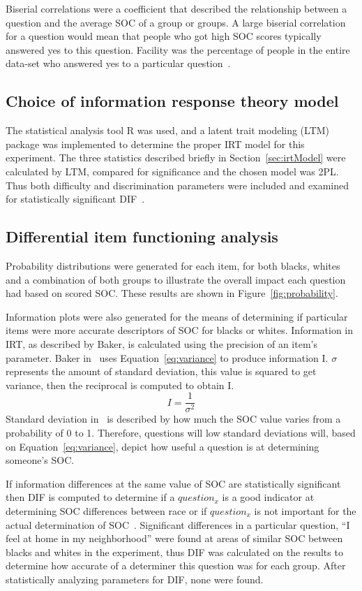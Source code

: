 \documentclass{sig-alternate}
\begin{document}
Biserial correlations were a coefficient that described the relationship between a question and the average SOC of a group or groups. A large biserial correlation for a question would mean that people who got high SOC scores typically answered yes to this question. Facility was the percentage of people in the entire data-set who answered yes to a particular question~\cite{biserial:2006}.

\subsection{Choice of information response theory model}
The statistical analysis tool R was used, and a latent trait modeling (LTM) package was implemented to determine the proper IRT model for this experiment. The three statistics described briefly in Section~\ref{sec:irtModel} were calculated by LTM, compared for significance and the chosen model was 2PL. Thus both difficulty and discrimination parameters were included and examined for statistically significant DIF~\cite{disparities:2009}.

\subsection{Differential item functioning analysis}
Probability distributions were generated for each item, for both blacks, whites and a combination of both groups to illustrate the overall impact each question had based on scored SOC. These results are shown in Figure~\ref{fig:probability}.


Information plots were also generated for the means of determining if particular items were more accurate descriptors of SOC for blacks or whites. Information in IRT, as described by Baker, is calculated using the precision of an item's parameter. Baker in~\cite{irt:2001} uses Equation~\ref{eq:variance} to produce information I. $\sigma$ represents the amount of standard deviation, this value is squared to get variance, then the reciprocal is computed to obtain I.
\begin{equation}
\label{eq:variance}
I =  \frac{1}{  \sigma ^{2} } 
\end{equation}
Standard deviation in~\cite{disparities:2009} is described by how much the SOC value varies from a probability of 0 to 1. Therefore, questions will low standard deviations will, based on Equation~\ref{eq:variance}, depict how useful a question is at determining someone's SOC. 

If information differences at the same value of SOC are statistically significant then DIF is computed to determine if a $question_x$ is a good indicator at determining SOC differences between race or if $question_x$ is not important for the actual determination of SOC~\cite{disparities:2009}.
Significant differences in a particular question, ``I feel at home in my neighborhood'' were found at areas of similar SOC between blacks and whites in the experiment, thus DIF was calculated on the results to determine how accurate of a determiner this question was for each group. After statistically analyzing parameters for DIF, none were found.
\end{document}
